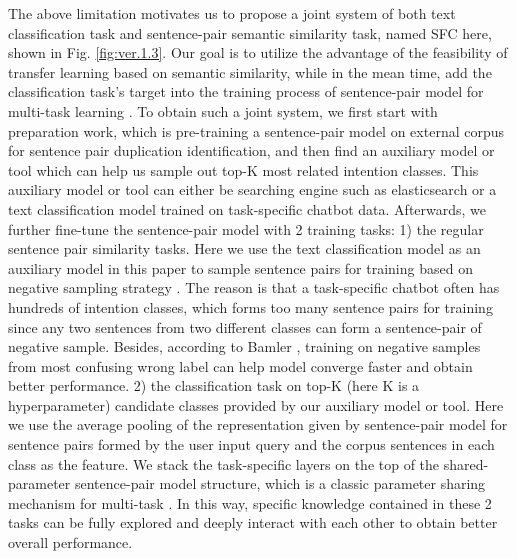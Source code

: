 \documentclass[letterpaper]{article} %
\begin{document}
  The  above  limitation  motivates  us  to  propose a joint system of both text
  classification  task  and  sentence-pair  semantic  similarity task, named SFC
  here, shown in Fig. \ref{fig:ver.1.3}. Our goal is to utilize the advantage of
  the  feasibility  of  transfer learning based on semantic similarity, while in
  the  mean time, add the classification task's target into the training process
  of            sentence-pair           model           for           multi-task
  learning \cite{caruana1993multitask,collobert2008unified}.  To  obtain  such  a
  joint  system,  we  first start with preparation work, which is pre-training a
  sentence-pair   model   on  external  corpus  for  sentence  pair  duplication
  identification,  and  then  find  an auxiliary model or tool which can help us
  sample out top-K most related intention classes. This auxiliary model or tool can
  either  be searching engine such as elasticsearch \cite{divya2013elasticsearch}
  or  a  text  classification  model  trained  on  task-specific  chatbot  data.
  Afterwards,  we  further  fine-tune  the  sentence-pair  model with 2 training
  tasks:  1)  the  regular  sentence pair similarity tasks. Here we use the text
  classification  model  as  an auxiliary model in this paper to sample sentence
  pairs       for       training       based      on      negative      sampling
  strategy \cite{bamler2020extreme}.  The  reason is that a task-specific chatbot
  often  has hundreds of intention classes, which forms too many sentence pairs for
  training  since  any  two  sentences  from  two  different  classes can form a
  sentence-pair     of     negative     sample.     Besides,     according    to
  Bamler \cite{bamler2020extreme},   training   on  negative  samples  from  most
  confusing  wrong  label  can  help  model  converge  faster  and obtain better
  performance.  2) the classification task on top-K (here K is a hyperparameter)
  candidate  classes  provided  by  our auxiliary model or tool. Here we use the
  average  pooling  of  the  representation  given  by  sentence-pair  model for
  sentence pairs formed by the user input query and the corpus sentences in each
  class  as  the  feature.  We  stack the task-specific layers on the top of the
  shared-parameter  sentence-pair  model structure, which is a classic parameter
  sharing                                   mechanism \cite{collobert2008unified,
  subramanian2018learning,liu2019multi}   for  multi-task \cite{sun2019fine}.  In
  this  way, specific knowledge contained in these 2 tasks can be fully explored
  and deeply interact with each other to obtain better overall performance.
\end{document}
